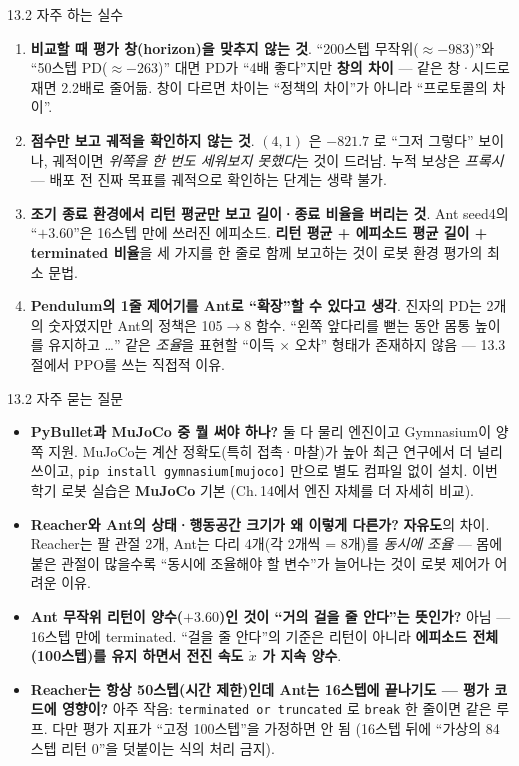 \documentclass[aspectratio=169,11pt]{beamer}
\begin{document}
\begin{frame}{13.2 자주 하는 실수}
  \begin{enumerate}
    \item \textbf{비교할 때 평가 창(horizon)을 맞추지 않는 것}.
      ``200스텝 무작위($\approx -983$)''와 ``50스텝 PD($\approx -263$)''
      대면 PD가 ``4배 좋다''지만 \textbf{창의 차이} --- 같은 창·시드로
      재면 2.2배로 줄어듦. 창이 다르면 차이는 ``정책의 차이''가 아니라
      ``프로토콜의 차이''.
    \item \textbf{점수만 보고 궤적을 확인하지 않는 것}. $(4,1)$ 은
      $-821.7$ 로 ``그저 그렇다'' 보이나, 궤적이면 \emph{위쪽을 한 번도
      세워보지 못했다}는 것이 드러남. 누적 보상은 \emph{프록시} ---
      배포 전 진짜 목표를 궤적으로 확인하는 단계는 생략 불가.
    \item \textbf{조기 종료 환경에서 리턴 평균만 보고 길이·종료 비율을
      버리는 것}. Ant seed4의 ``$+3.60$''은 16스텝 만에 쓰러진
      에피소드. \textbf{리턴 평균 + 에피소드 평균 길이 + terminated
      비율}을 세 가지를 한 줄로 함께 보고하는 것이 로봇 환경 평가의
      최소 문법.
    \item \textbf{Pendulum의 1줄 제어기를 Ant로 ``확장''할 수 있다고
      생각}. 진자의 PD는 2개의 숫자였지만 Ant의 정책은 105$\to$8 함수.
      ``왼쪽 앞다리를 뻗는 동안 몸통 높이를 유지하고 …'' 같은 \emph{조율}을
      표현할 ``이득 $\times$ 오차'' 형태가 존재하지 않음 --- 13.3절에서
      PPO를 쓰는 직접적 이유.
  \end{enumerate}
\end{frame}

\begin{frame}{13.2 자주 묻는 질문}
  \small
  \begin{itemize}
    \item \textbf{PyBullet과 MuJoCo 중 뭘 써야 하나?} 둘 다 물리 엔진이고
      Gymnasium이 양쪽 지원. MuJoCo는 계산 정확도(특히 접촉·마찰)가 높아
      최근 연구에서 더 널리 쓰이고, \texttt{pip install gymnasium[mujoco]}
      만으로 별도 컴파일 없이 설치. 이번 학기 로봇 실습은 \textbf{MuJoCo}
      기본 (Ch.\,14에서 엔진 자체를 더 자세히 비교).
    \item \textbf{Reacher와 Ant의 상태·행동공간 크기가 왜 이렇게 다른가?}
      \textbf{자유도}의 차이. Reacher는 팔 관절 2개, Ant는 다리 4개(각 2개씩
      = 8개)를 \emph{동시에 조율} --- 몸에 붙은 관절이 많을수록 ``동시에
      조율해야 할 변수''가 늘어나는 것이 로봇 제어가 어려운 이유.
    \item \textbf{Ant 무작위 리턴이 양수($+3.60$)인 것이 ``거의 걸을 줄
      안다''는 뜻인가?} 아님 --- 16스텝 만에 terminated. ``걸을 줄
      안다''의 기준은 리턴이 아니라 \textbf{에피소드 전체(100스텝)를 유지
      하면서 전진 속도 $\dot{x}$ 가 지속 양수}.
    \item \textbf{Reacher는 항상 50스텝(시간 제한)인데 Ant는 16스텝에
      끝나기도 --- 평가 코드에 영향이?} 아주 작음: \texttt{terminated or
      truncated} 로 \texttt{break} 한 줄이면 같은 루프. 다만 평가 지표가
      ``고정 100스텝''을 가정하면 안 됨 (16스텝 뒤에 ``가상의 84스텝
      리턴 0''을 덧붙이는 식의 처리 금지).
  \end{itemize}
\end{frame}
\end{document}
